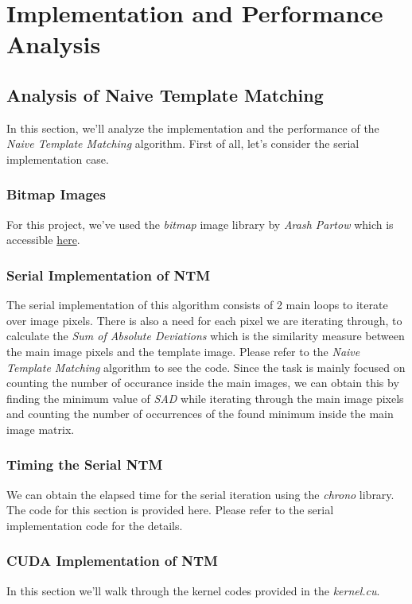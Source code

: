 \chapter{Implementation and Performance Analysis}

\section{Analysis of Naive Template Matching}
In this section, we'll analyze the implementation and the performance of the \textit{Naive Template Matching} algorithm. First of all, let's consider the serial implementation case. 

\subsection{Bitmap Images}
For this project, we've used the \textit{bitmap} image library by \textit{Arash Partow} which is accessible \href{https://github.com/ArashPartow/bitmap}{here}.

\subsection{Serial Implementation of NTM}
The serial implementation of this algorithm consists of 2 main loops to iterate over image pixels. There is also a need for each pixel we are iterating through, to calculate the \textit{Sum of Absolute Deviations} which is the similarity measure between the main image pixels and the template image. Please refer to the \textit{Naive Template Matching} algorithm to see the code. Since the task is mainly focused on counting the number of occurance inside the main images, we can obtain this by finding the minimum value of \textit{SAD} while iterating through the main image pixels and counting the number of occurrences of the found minimum inside the main image matrix.

\subsection{Timing the Serial NTM}
We can obtain the elapsed time for the serial iteration using the \textit{chrono} library. The code for this section is provided here. Please refer to the serial implementation code for the details. 

\subsection{CUDA Implementation of NTM}
In this section we'll walk through the kernel codes provided in the \textit{kernel.cu}.

